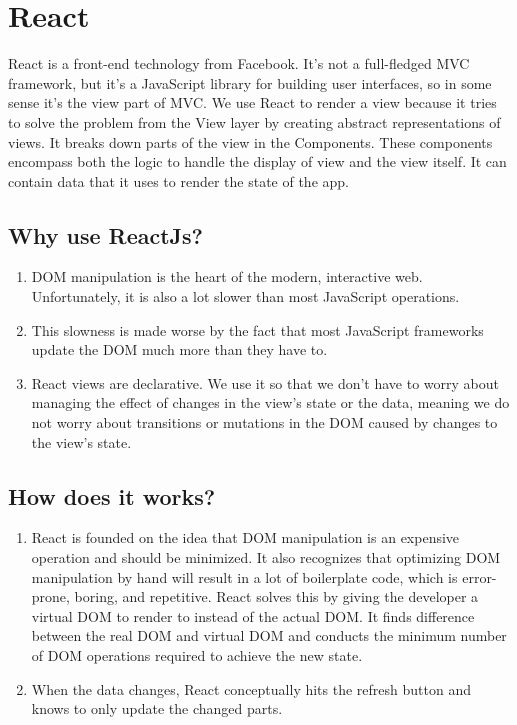 \documentclass[12pt,a4paper]{report}
\begin{document}
\section{React}
React \cite{wiki:reactjs} is a front-end technology from Facebook. It's not a full-fledged MVC framework, but it's a JavaScript library for building user interfaces, so in some sense it's the view part of MVC. We use React to render a view because it tries to solve the problem from the View layer by creating abstract representations of views. It breaks down parts of the view in the Components. These components encompass both the logic to handle the display of view and the view itself. It can contain data that it uses to render the state of the app. 
\subsection{Why use ReactJs?}\cite{parking_marketplace_srs}
\begin{enumerate}
	\renewcommand{\labelenumi}{{\textbf{\arabic{enumi}.}}}
	\item DOM manipulation is the heart of the modern, interactive web. Unfortunately, it is also a lot slower than most JavaScript operations.
	\item This slowness is made worse by the fact that most JavaScript frameworks update the DOM much more than they have to.
	\item React views are declarative. We use it so that we don't have to worry about managing the effect of changes in the view's state or the data, meaning we do not worry about transitions or mutations in the DOM caused by changes to the view's state.  
\end{enumerate}
\subsection{How does it works?}\cite{parking_marketplace_srs}
\begin{enumerate}
	\renewcommand{\labelenumi}{{\textbf{\arabic{enumi}.}}}
	\item React is founded on the idea that DOM manipulation is an expensive operation and should be minimized. It also recognizes that optimizing DOM manipulation by hand will result in a lot of boilerplate code, which is error-prone, boring, and repetitive. React solves this by giving the developer a virtual DOM to render to instead of the actual DOM. It finds difference between the real DOM and virtual DOM and conducts the minimum number of DOM operations required to achieve the new state.  
	\item When the data changes, React conceptually hits the refresh button and knows to only update the changed parts.
  
\end{enumerate}
\end{document}

